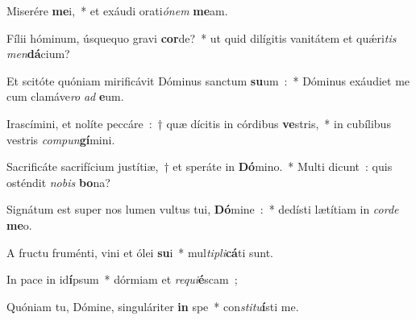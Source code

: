 ﻿\item Miserére \textbf{me}i,~* et exáudi orati\emph{ó}\emph{nem} \textbf{me}am.
\item Fílii hóminum, úsquequo gravi \textbf{cor}de?~* ut quid dilígitis vanitátem et quǽri\emph{tis} \emph{men}\textbf{dá}cium?
\item Et scitóte quóniam mirificávit Dóminus sanctum \textbf{su}um~:~* Dóminus exáudiet me cum clamáve\emph{ro} \emph{ad} \textbf{e}um.
\item Irascímini, et nolíte peccáre~:~† quæ dícitis in córdibus \textbf{ve}stris,~* in cubílibus vestris \emph{com}\emph{pun}\textbf{gí}mini.
\item Sacrificáte sacrifícium justítiæ,~† et speráte in \textbf{Dó}mino.~* Multi dicunt~: quis osténdit \emph{no}\emph{bis} \textbf{bo}na?
\item Signátum est super nos lumen vultus tui, \textbf{Dó}mine~:~* dedísti lætítiam in \emph{cor}\emph{de} \textbf{me}o.
\item A fructu fruménti, vini et ólei \textbf{su}i~* mul\emph{ti}\emph{pli}\textbf{cá}ti sunt.
\item In pace in id\textbf{í}psum~* dórmiam et \emph{re}\emph{qui}\textbf{é}scam~;
\item Quóniam tu, Dómine, singuláriter \textbf{in} spe~* con\emph{sti}\emph{tu}\textbf{í}sti me.